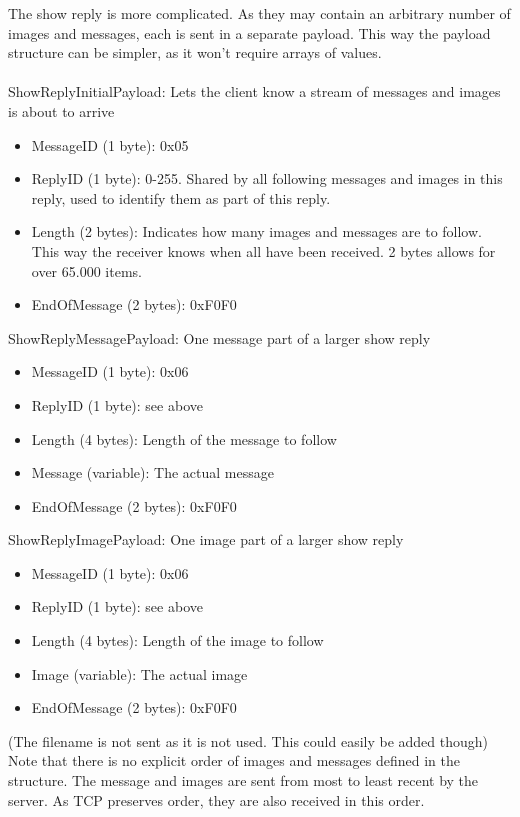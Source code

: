 \documentclass{article}
\begin{document}
The show reply is more complicated. As they may contain an arbitrary number of images and messages, each is sent in a separate payload. This way the payload structure can be simpler, as it won't require arrays of values. \\ \\

ShowReplyInitialPayload: Lets the client know a stream of messages and images is about to arrive
\begin{itemize}
\item MessageID (1 byte): 0x05
\item ReplyID (1 byte): 0-255. Shared by all following messages and images in this reply, used to identify them as part of this reply.
\item Length (2 bytes): Indicates how many images and messages are to follow. This way the receiver knows when all have been received. 2 bytes allows for over 65.000 items.
\item EndOfMessage (2 bytes): 0xF0F0
\end{itemize}
\vspace{8mm}
ShowReplyMessagePayload: One message part of a larger show reply
\begin{itemize}
\item MessageID (1 byte): 0x06
\item ReplyID (1 byte): see above
\item Length (4 bytes): Length of the message to follow
\item Message (variable): The actual message
\item EndOfMessage (2 bytes): 0xF0F0
\end{itemize}
\vspace{8mm}
ShowReplyImagePayload: One image part of a larger show reply
\begin{itemize}
\item MessageID (1 byte): 0x06
\item ReplyID (1 byte): see above
\item Length (4 bytes): Length of the image to follow
\item Image (variable): The actual image
\item EndOfMessage (2 bytes): 0xF0F0
\end{itemize}
(The filename is not sent as it is not used. This could easily be added though) \\ 

Note that there is no explicit order of images and messages defined in the structure. The message and images are sent from most to least recent by the server. As TCP preserves order, they are also received in this order.
\end{document}
